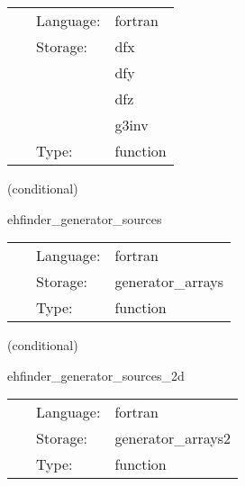 \hspace{5mm}{\it calculate the source terms } 


\hspace{5mm}

 \begin{tabular*}{160mm}{cll} 
~ & Language:  & fortran \\ 
~ & Storage:  & dfx \\ 
~& ~ &dfy\\ 
~& ~ &dfz\\ 
~& ~ &g3inv\\ 
~ & Type:  & function \\ 
\end{tabular*} 


\vspace{5mm}

   (conditional) 

\hspace{5mm} ehfinder\_generator\_sources 

\hspace{5mm}{\it calculate the source terms for the generator evolution } 


\hspace{5mm}

 \begin{tabular*}{160mm}{cll} 
~ & Language:  & fortran \\ 
~ & Storage:  & generator\_arrays \\ 
~ & Type:  & function \\ 
\end{tabular*} 


\vspace{5mm}

   (conditional) 

\hspace{5mm} ehfinder\_generator\_sources\_2d 

\hspace{5mm}{\it calculate the source terms for the 2d generator evolution } 


\hspace{5mm}

 \begin{tabular*}{160mm}{cll} 
~ & Language:  & fortran \\ 
~ & Storage:  & generator\_arrays2 \\ 
~ & Type:  & function \\ 
\end{tabular*} 


